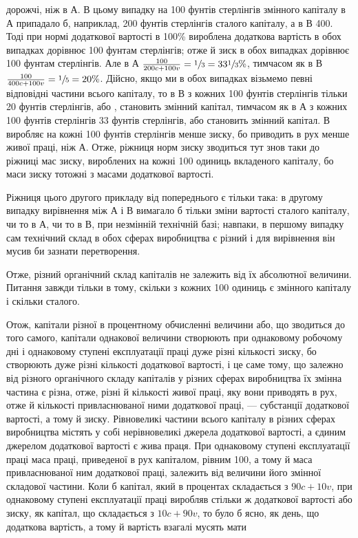 \parcont{}  %
дорожчі, ніж в $А$. В цьому випадку на 100 фунтів стерлінгів
змінного капіталу в $А$ припадало б, наприклад, 200 фунтів
стерлінгів сталого капіталу, а в $В$ 400. Тоді при нормі додаткової вартості в 100\% вироблена
додаткова вартість в обох випадках дорівнює 100 фунтам стерлінгів; отже й зиск в обох випадках
дорівнює 100 фунтам стерлінгів. Але в $А$ $\frac{100}{200 c + 100 v} =
\sfrac{1}{3} = 33 \sfrac{1}{3}\%$, тимчасом як в $В$ $\frac{100}{400 c + 100 v }= \sfrac{1}{5}=20\%$. Дійсно,
якщо ми в обох випадках візьмемо певні відповідні частини
всього капіталу, то в $В$ з кожних 100 фунтів стерлінгів тільки
20 фунтів стерлінгів, або , становить змінний капітал, тимчасом як в $А$ з кожних 100 фунтів
стерлінгів 33 фунтів стерлінгів, або  становить змінний капітал. $В$ виробляє на кожні 100
фунтів стерлінгів менше зиску, бо приводить в рух менше
живої праці, ніж $А$. Отже, ріжниця норм зиску зводиться тут
знов таки до ріжниці мас зиску, вироблених на кожні 100 одиниць вкладеного капіталу, бо маси зиску
тотожні з масами додаткової вартості.

Ріжниця цього другого прикладу від попереднього є тільки
така: в другому випадку вирівнення між $А$ і $В$ вимагало б тільки
зміни вартості сталого капіталу, чи то в $А$, чи то в $В$, при незмінній технічній базі; навпаки, в
першому випадку сам технічний склад в обох сферах виробництва є різний і для вирівнення він мусив би
зазнати перетворення.

Отже, різний органічний склад капіталів не залежить від їх
абсолютної величини. Питання завжди тільки в тому, скільки
з кожних 100 одиниць є змінного капіталу і скільки сталого.

Отож, капітали різної в процентному обчисленні величини
або, що зводиться до того самого, капітали однакової величини
створюють при однаковому робочому дні і однаковому ступені
експлуатації праці дуже різні кількості зиску, бо створюють
дуже різні кількості додаткової вартості, і це саме тому, що
залежно від різного органічного складу капіталів у різних сферах виробництва їх змінна частина є
різна, отже, різні й кількості живої праці, яку вони приводять в рух, отже й кількості
привласнюваної ними додаткової праці, — субстанції додаткової
вартості, а тому й зиску. Рівновеликі частини всього капіталу
в різних сферах виробництва містять у собі нерівновеликі джерела додаткової вартості, а єдиним
джерелом додаткової вартості є жива праця. При однаковому ступені експлуатації праці маса праці,
приведеної в рух капіталом, рівним 100, а тому й
маса привласнюваної ним додаткової праці, залежить від величини
його змінної складової частини. Коли б капітал, який в процентах складається з $90 c + 10 v$, при
однаковому ступені експлуатації праці виробляв стільки ж додаткової вартості або зиску, як капітал,
що складається з $10 c + 90 v$, то було б ясно, як день,
що додаткова вартість, а тому й вартість взагалі мусять мати
\parbreak{}  %
